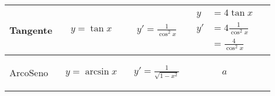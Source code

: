 \documentclass[../../main]{subfiles}
\begin{document}
\begin{center}
{\begin{tabular}{ |p{7em}|p{5em}|p{5em}|p{7em}|p{5cm}| }
            \hline

            \begin{center}
                Tangente
            \end{center} &
            \begin{align}
                y=\tan{x} \nonumber
            \end{align}  &
            \begin{align}
                y'=\frac{1}{\cos^2{x}} \nonumber
            \end{align} &
            {
                \begin{align}
                    y  & = 4 \tan{x} \nonumber \\
                    y' & = 4 \frac{1}{\cos^2{x}} \nonumber \\
                       & = \frac{4}{\cos^2{x}} \nonumber
                \end{align}
            } &
            {
            \begin{center}
            \end{center}
            } \\

            \hline
            
            \begin{center}
                ArcoSeno
            \end{center} &
            \begin{align}
                y=\arcsin{x} \nonumber
            \end{align}  &
            \begin{align}
                y'= \frac{1}{\sqrt{1-x^2}} \nonumber
            \end{align} &
            {
                \begin{align}
                    a
                \end{align}
            } &
            {
            \begin{center}
            \end{center}
            } \\

            \hline


\end{tabular}}
\end{center}
\end{document}
